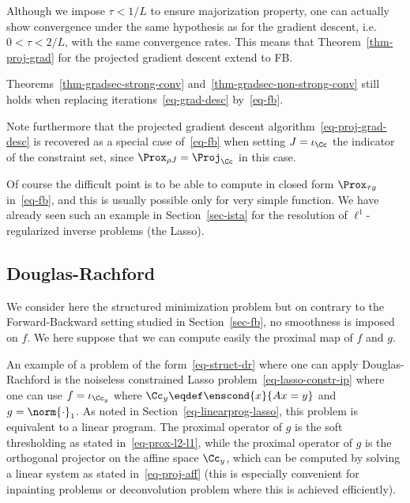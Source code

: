 Although we impose $\tau<1/L$ to ensure majorization property, one can actually show convergence under the same hypothesis as for the gradient descent, i.e. $0 < \tau < 2/L$, with the same convergence rates.  This means that Theorem~\ref{thm-proj-grad} for the projected gradient descent extend to FB. 

\begin{thm}\label{thm-fb-conv}
	Theorems~\ref{thm-gradsec-strong-conv} and~\ref{thm-gradsec-non-strong-conv} still holds when replacing iterations~\eqref{eq-grad-desc} by~\eqref{eq-fb}.
\end{thm}

Note furthermore that the projected gradient descent algorithm~\eqref{eq-proj-grad-desc} is recovered as a special case of~\eqref{eq-fb} when setting $J=\iota_{\Cc}$ the indicator of the constraint set, since $\Prox_{\rho J} = \Proj_{\Cc}$ in this case.

Of course the difficult point is to be able to compute in closed form $\Prox_{\tau g}$ in~\eqref{eq-fb}, and this is usually possible only for very simple function. We have already seen such an example in Section~\ref{sec-ista} for the resolution of $\ell^1$-regularized inverse problems (the Lasso).


\subsection{Douglas-Rachford}

We consider here the structured minimization problem
but on contrary to the Forward-Backward setting studied in Section~\ref{sec-fb}, no smoothness is imposed on $f$. We here suppose that we can compute easily the proximal map of $f$ and $g$.

\begin{exmp}
An example of a problem of the form~\eqref{eq-struct-dr} where one can apply Douglas-Rachford is the noiseless constrained Lasso problem~\eqref{eq-lasso-constr-ip}
where one can use $f=\iota_{\Cc_y}$ where $\Cc_y \eqdef \enscond{x}{Ax=y}$ and $g=\norm{\cdot}_1$.
%
As noted in Section~\ref{eq-linearprog-lasso}, this problem is equivalent to a linear program.
%
The proximal operator of $g$ is the soft thresholding as stated in~\eqref{eq-prox-l2-l1}, while the proximal operator of $g$ is the orthogonal projector on the affine space $\Cc_y$, which can be computed by solving a linear system as stated in~\eqref{eq-proj-aff} (this is especially convenient for inpainting problems or deconvolution problem where this is achieved efficiently).
\end{exmp}

